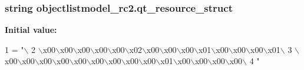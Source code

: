 \subsubsection[{qt\+\_\+resource\+\_\+struct}]{\setlength{\rightskip}{0pt plus 5cm}string objectlistmodel\+\_\+rc2.\+qt\+\_\+resource\+\_\+struct}\label{namespaceobjectlistmodel__rc2_ad56f1a5b59042e85be0038eb98a44f23}
{\bfseries Initial value\+:}
\begin{DoxyCode}
1 = \textcolor{stringliteral}{"\(\backslash\)}
2 \textcolor{stringliteral}{\(\backslash\)x00\(\backslash\)x00\(\backslash\)x00\(\backslash\)x00\(\backslash\)x00\(\backslash\)x02\(\backslash\)x00\(\backslash\)x00\(\backslash\)x00\(\backslash\)x01\(\backslash\)x00\(\backslash\)x00\(\backslash\)x00\(\backslash\)x01\(\backslash\)}
3 \textcolor{stringliteral}{\(\backslash\)x00\(\backslash\)x00\(\backslash\)x00\(\backslash\)x00\(\backslash\)x00\(\backslash\)x00\(\backslash\)x00\(\backslash\)x00\(\backslash\)x00\(\backslash\)x01\(\backslash\)x00\(\backslash\)x00\(\backslash\)x00\(\backslash\)x00\(\backslash\)}
4 \textcolor{stringliteral}{"}
\end{DoxyCode}
